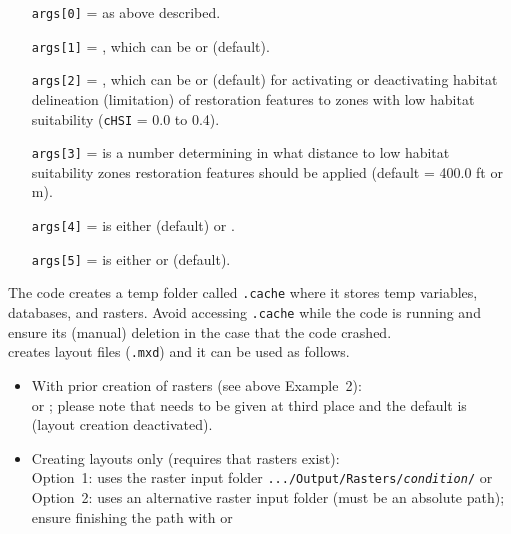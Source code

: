 \begin{itemize}
\begin{itemize}
				\item[\small{\texttt{args[0]}}] =  as above described.
				\item[\small{\texttt{args[1]}}] = , which can be  or  (default).
				\item[\small{\texttt{args[2]}}] = , which can be  or  (default) for activating or deactivating habitat delineation (limitation) of restoration features to zones with low habitat suitability (\texttt{cHSI} = 0.0 to 0.4).
				\item[\small{\texttt{args[3]}}] =  is a  number determining in what distance to low habitat suitability zones restoration features should be applied (default = 400.0 ft or m).
				\item[\small{\texttt{args[4]}}] =  is either  (default) or .
				\item[\small{\texttt{args[5]}}] =  is either  or  (default).
				\end{itemize}
\end{itemize}

The code creates a temp folder called \texttt{.cache} where it stores temp variables, databases, and rasters. Avoid accessing \texttt{.cache} while the code is running and ensure its (manual) deletion in the case that the code crashed.\\

 creates layout files (\texttt{.mxd}) and it can be used as follows.
\begin{itemize}
	\item With prior creation of rasters (see above Example~2):\\
	 or ; please note that  needs to be given at third place and the default is  (layout creation deactivated).
	\item Creating layouts only (requires that rasters exist):\\
	Option~1:  uses the raster input folder \texttt{.../Output/Rasters/\textit{condition}/} or \\
	Option~2:  uses an alternative raster input folder (must be an absolute path); ensure finishing the path with  or 
\end{itemize}

